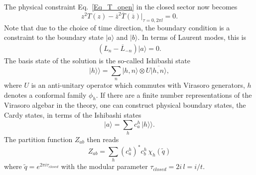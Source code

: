\documentclass[submission, PhysLectNotes]{SciPost}
\begin{document}
The physical constraint Eq.~\ref{Eq_T_open} in the closed sector now becomes 
\begin{equation}
    z^2 T(z) - \overline{z}^2 \overline{T}(\overline{z})\vert_{\tau=0,2\pi l} = 0.
\end{equation}
Note that due to the choice of time direction, the boundary condition is a constraint to the boundary state $\vert a \rangle$ and $\vert b\rangle$. In terms of Laurent modes, this is
\begin{equation}
    \begin{split}
        \left(L_n - \overline{L}_{-n}\right) \vert a \rangle = 0.  
    \end{split}
\end{equation}
The basis state of the solution is the so-called Ishibashi state
\begin{equation}
    \vert h \rangle\rangle = \sum_n \vert h,n\rangle \otimes U\overline{\vert h,n\rangle},
\end{equation}
where $U$ is an anti-unitary operator which commutes with Virasoro generators, $h$ denotes a conformal family $\phi_h$. If there are a finite number representations of the Virasoro algebar in the theory, one can construct physical boundary states, the Cardy states, in terms of the Ishibashi states
\begin{equation}
    \vert a \rangle = \sum_h c_a^h\, \vert h \rangle \rangle. 
\end{equation}
The partition function $Z_{ab}$ then reads
\begin{equation}
    Z_{ab} = \sum_h {\left(c_a^h\right)}^* c_b^h\, \chi_h(\tilde{q})
\end{equation}
where $\tilde{q} = e^{2\pi i \tau_{closed}}$ with the modular parameter $\tau_{closed} = 2i\,l = i/t$.
\end{document}
